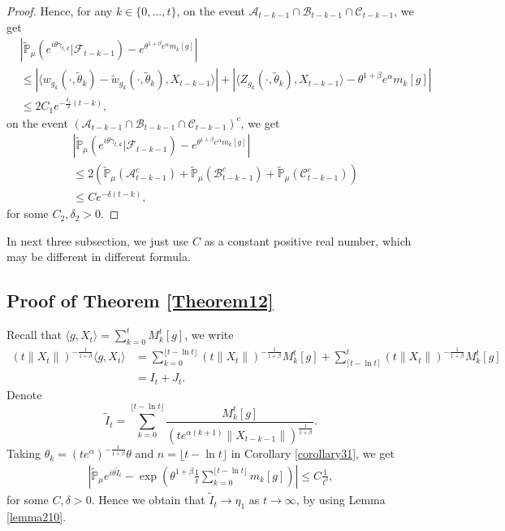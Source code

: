 \documentclass{article}
\begin{document}
\begin{proof}
Hence, for any $k\in\{0,...,t\}$, on the event $\mathcal{A}_{t-k-1}\cap\mathcal{B}_{t-k-1}\cap\mathcal{C}_{t-k-1}$, we get
\begin{align*}
   &\left|\mathbb{\tilde{P}}_{\mu}\left(e^{i\theta \gamma_{t,k}}|\mathcal{F}_{t-k-1}\right)-e^{\theta^{1+\beta}e^{\alpha}m_k[g]}\right|\\
   &\leq \left|\langle w_{g_k}(\cdot,\tilde{\theta}_k)-\tilde{w}_{g_k}(\cdot,\tilde{\theta}_k), X_{t-k-1}\rangle\right|
   +\left|\langle Z_{g_k}(\cdot,\tilde{\theta}_k),X_{t-k-1}\rangle-\theta^{1+\beta}e^{\alpha}m_k[g]\right|\\
   &\leq 2C_1 e^{-\frac{\delta_1}{2}(t-k)},
\end{align*}
on the event $(\mathcal{A}_{t-k-1}\cap\mathcal{B}_{t-k-1}\cap\mathcal{C}_{t-k-1})^c$, we get
\begin{align*}
    &\left|\mathbb{\tilde{P}}_{\mu}\left(e^{i\theta \gamma_{t,k}}|\mathcal{F}_{t-k-1}\right)-e^{\theta^{1+\beta}e^{\alpha}m_k[g]}\right|\\
    &\leq 2(\mathbb{\tilde{P}}_{\mu}(\mathcal{A}^c_{t-k-1})+\mathbb{\tilde{P}}_{\mu}(\mathcal{B}^c_{t-k-1})+\mathbb{\tilde{P}}_{\mu}(\mathcal{C}^c_{t-k-1}))\\
    &\leq C e^{-\delta(t-k)},
\end{align*}
for some $C_2,\delta_2>0$.
\end{proof}


In next three subsection, we just use $C$ as a constant positive real number, which may be different in different formula.
\subsection{Proof of Theorem \ref{Theorem12}}

    Recall that $\langle g,X_t\rangle=\sum_{k=0}^t M_k^t[g]$, we write
    \begin{align*}
        (t\|X_t\|)^{-\frac{1}{1+\beta}}\langle g,X_t\rangle&=\sum_{k=0}^{\lfloor t-\ln t \rfloor} (t\|X_t\|)^{-\frac{1}{1+\beta}}M_k^t[g]+\sum_{\lceil t-\ln t \rceil}^t (t\|X_t\|)^{-\frac{1}{1+\beta}}M_k^t[g]\\
        &=I_t+J_t.
    \end{align*}
    Denote
    $$\tilde{I}_t=\sum_{k=0}^{\lfloor t-\ln t \rfloor}\frac{M_k^t[g]}{(t e^{\alpha(k+1)}\|X_{t-k-1}\|)^{\frac{1}{1+\beta}}}.$$
    Taking $\theta_k=(t e^{\alpha})^{-\frac{1}{1+\beta}} \theta $ and $n={\lfloor t-\ln t \rfloor}$ in Corollary \ref{corollary31}, we get
    \begin{align*}
        \left|\mathbb{\tilde{P}}_{\mu}e^{i\theta\tilde{I}_t}-\exp\left(\theta^{1+\beta}\frac{1}{t}\sum_{k=0}^{\lfloor t-\ln t \rfloor}m_k[g]\right)\right|\leq C \frac{1}{t^{\delta}},
    \end{align*}
    for some $C,\delta>0$. Hence we obtain that $\tilde{I}_t\rightarrow\eta_1$ as $t\rightarrow \infty$, by using Lemma \ref{lemma210}.
    
\end{document}
